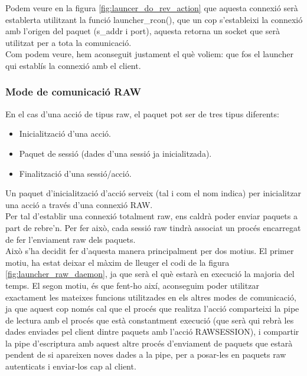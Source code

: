 Podem veure en la figura \ref{fig:launcer_do_rev_action} que aquesta connexió serà establerta utilitzant
la funció launcher\_rcon(), que un cop s'estableixi la connexió amb l'origen del paquet (s\_addr i port),
aquesta retorna un socket que serà utilitzat per a tota la comunicació. \\

Com podem veure, hem aconseguit justament el què voliem: que fos el launcher qui establís la connexió amb
el client.

\subsubsection{Mode de comunicació RAW}
En el cas d'una acció de tipus raw, el paquet pot ser de tres tipus diferents:
\begin{itemize}
\item Inicialització d'una acció.
\item Paquet de sessió (dades d'una sessió ja inicialitzada).
\item Finalització d'una sessió/acció.
\end{itemize}

Un paquet d'inicialització d'acció serveix (tal i com el nom indica) per inicialitzar una acció a través
d'una connexió RAW. \\

Per tal d'establir una connexió totalment raw, ens caldrà poder enviar paquets a part de rebre'n. Per fer 
això, cada sessió raw tindrà associat un procés encarregat de fer l'enviament raw dels paquets. \\

Això s'ha decidit fer d'aquesta manera principalment per dos motius. El primer motiu, ha estat deixar 
el màxim de lleuger el codi de la figura \ref{fig:launcher_raw_daemon}, ja que serà el què estarà en execució la majoria del temps.
El segon motiu, és que fent-ho així, aconseguim poder utilitzar exactament les mateixes funcions utilitzades
en els altres modes de comunicació, ja que aquest cop només cal que el procés que realitza l'acció 
comparteixi la pipe de lectura amb el procés que està constantment execució (que serà qui rebrà les dades
enviades pel client dintre paquets amb l'acció RAWSESSION), i compartir la pipe d'escriptura amb aquest altre
procés d'enviament de paquets que estarà pendent de si apareixen noves dades a la pipe, per a posar-les en
paquets raw autenticats i enviar-los cap al client.

